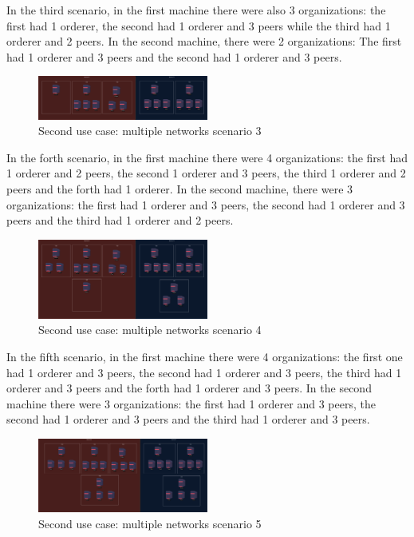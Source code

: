 In the third scenario, in the first machine there were also 3 organizations: the first had 1 orderer, the second had 1 orderer and 3 peers while the third had 1 orderer and 2 peers. In the second machine, there were 2 organizations: The first had 1 orderer and 3 peers and the second had 1 orderer and 3 peers.

\begin{figure}[H]
    \centering
    \includegraphics[width=0.5\textwidth]{assets/use-case-2/scenario3.png} %
    \caption{Second use case: multiple networks scenario 3}
    \label{fig:sample-image} 
\end{figure}

In the forth scenario, in the first machine there were 4 organizations: the first had 1 orderer and 2 peers, the second 1 orderer and 3 peers, the third 1 orderer and 2 peers and the forth had 1 orderer. In the second machine, there were 3 organizations: the first had 1 orderer and 3 peers, the second had 1 orderer and 3 peers and the third had 1 orderer and 2 peers.

\begin{figure}[H]
    \centering
    \includegraphics[width=0.5\textwidth]{assets/use-case-2/scenario4.png} %
    \caption{Second use case: multiple networks scenario 4}
    \label{fig:sample-image} 
\end{figure}

In the fifth scenario, in the first machine there were 4 organizations: the first one had 1 orderer and 3 peers, the second had 1 orderer and 3 peers, the third had 1 orderer and 3 peers and the forth had 1 orderer and 3 peers. In the second machine there were 3 organizations: the first had 1 orderer and 3 peers, the second had 1 orderer and 3 peers and the third had 1 orderer and 3 peers.

\begin{figure}[H]
    \centering
    \includegraphics[width=0.5\textwidth]{assets/use-case-2/scenario5.png} %
    \caption{Second use case: multiple networks scenario 5}
    \label{fig:sample-image} 
\end{figure}

